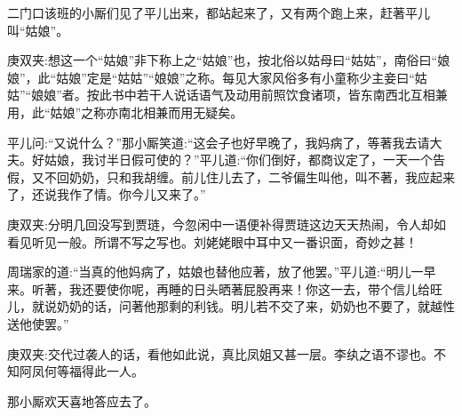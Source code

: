 \begin{parag}
    二门口该班的小厮们见了平儿出来，都站起来了，又有两个跑上来，赶著平儿叫“姑娘”。\begin{note}庚双夹:想这一个“姑娘”非下称上之“姑娘”也，按北俗以姑母曰“姑姑”，南俗曰“娘娘”，此“姑娘”定是“姑姑”“娘娘”之称。每见大家风俗多有小童称少主妾曰“姑姑”“娘娘”者。按此书中若干人说话语气及动用前照饮食诸项，皆东南西北互相兼用，此“姑娘”之称亦南北相兼而用无疑矣。\end{note}平儿问:“又说什么？”那小厮笑道:“这会子也好早晚了，我妈病了，等著我去请大夫。好姑娘，我讨半日假可使的？”平儿道:“你们倒好，都商议定了，一天一个告假，又不回奶奶，只和我胡缠。前儿住儿去了，二爷偏生叫他，叫不著，我应起来了，还说我作了情。你今儿又来了。”\begin{note}庚双夹:分明几回没写到贾琏，今忽闲中一语便补得贾琏这边天天热闹，令人却如看见听见一般。所谓不写之写也。刘姥姥眼中耳中又一番识面，奇妙之甚！\end{note}周瑞家的道:“当真的他妈病了，姑娘也替他应著，放了他罢。”平儿道:“明儿一早来。听著，我还要使你呢，再睡的日头晒著屁股再来！你这一去，带个信儿给旺儿，就说奶奶的话，问著他那剩的利钱。明儿若不交了来，奶奶也不要了，就越性送他使罢。”\begin{note}庚双夹:交代过袭人的话，看他如此说，真比凤姐又甚一层。李纨之语不谬也。不知阿凤何等福得此一人。\end{note}那小厮欢天喜地答应去了。
\end{parag}


